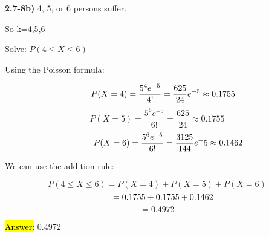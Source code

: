 \documentclass{article}
\begin{document}
\vspace{5mm}

\textbf{2.7-8b)} 4, 5, or 6 persons suffer. 

\vspace{2mm}

So k=4,5,6

\vspace{2mm}

Solve: $P(4 \le X \le 6)$

\vspace{2mm}

Using the Poisson formula:

$$\hspace{5mm}P(X=4)=\frac{5^{4}e^{-5}}{4!}=\frac{625}{24}e^{-5} \approx 0.1755$$
$$P(X=5)=\frac{5^{6}e^{-5}}{6!}=\frac{625}{24} \approx 0.1755$$
$$\hspace{9mm}P(X=6)=\frac{5^{6}e^{-5}}{6!}=\frac{3125}{144}e^-{5} \approx 0.1462$$

We can use the addition rule:

$$P(4 \le X \le 6)=P(X=4)+P(X=5)+P(X=6)$$
$$\hspace{0.2in}=0.1755+0.1755+0.1462$$
$$=0.4972$$

\vspace{2mm}

\hl{Answer:} 0.4972
\end{document}
